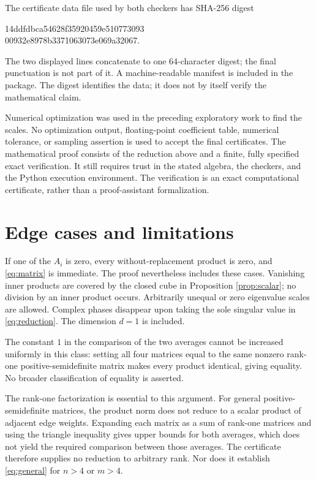 \documentclass[11pt,letterpaper]{article}
\begin{document}
The certificate data file used by both checkers has SHA-256 digest
\begin{center}\small\ttfamily
14ddfdbca54628f35920459e510773093\\
00932e8978b3371063073e069a32067.
\end{center}
The two displayed lines concatenate to one 64-character digest; the final punctuation is not part of it. A machine-readable manifest is included in the package. The digest identifies the data; it does not by itself verify the mathematical claim.

Numerical optimization was used in the preceding exploratory work to find the scales. No optimization output, floating-point coefficient table, numerical tolerance, or sampling assertion is used to accept the final certificates. The mathematical proof consists of the reduction above and a finite, fully specified exact verification. It still requires trust in the stated algebra, the checkers, and the Python execution environment. The verification is an exact computational certificate, rather than a proof-assistant formalization.

\section{Edge cases and limitations}
If one of the $A_i$ is zero, every without-replacement product is zero, and \eqref{eq:matrix} is immediate. The proof nevertheless includes these cases. Vanishing inner products are covered by the closed cube in Proposition \ref{prop:scalar}; no division by an inner product occurs. Arbitrarily unequal or zero eigenvalue scales are allowed. Complex phases disappear upon taking the sole singular value in \eqref{eq:reduction}. The dimension $d=1$ is included.

The constant $1$ in the comparison of the two averages cannot be increased uniformly in this class: setting all four matrices equal to the same nonzero rank-one positive-semidefinite matrix makes every product identical, giving equality. No broader classification of equality is asserted.

The rank-one factorization is essential to this argument. For general positive-semidefinite matrices, the product norm does not reduce to a scalar product of adjacent edge weights. Expanding each matrix as a sum of rank-one matrices and using the triangle inequality gives upper bounds for both averages, which does not yield the required comparison between those averages. The certificate therefore supplies no reduction to arbitrary rank. Nor does it establish \eqref{eq:general} for $n>4$ or $m>4$.
\end{document}
